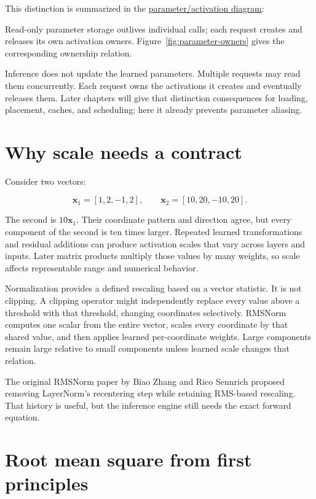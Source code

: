 This distinction is summarized in the
\href{https://github.com/hermonai/inside-the-llm-engine/blob/astra-visual-rewrite/diagrams/transformer/parameters-vs-activations.txt}{parameter/activation
diagram}:

Read-only parameter storage outlives individual calls; each request creates and releases its own activation owners. Figure~\ref{fig:parameter-owners} gives the corresponding ownership relation.

Inference does not update the learned parameters. Multiple requests may
read them concurrently. Each request owns the activations it creates and
eventually releases them. Later chapters will give that distinction
consequences for loading, placement, caches, and scheduling; here it
already prevents parameter aliasing.

\section{Why scale needs a
contract}\label{why-scale-needs-a-contract}

Consider two vectors:

\begin{equation}
\mathbf{x}_1=[1,2,-1,2],
\qquad
\mathbf{x}_2=[10,20,-10,20].
\end{equation}

The second is \(10\mathbf{x}_1\). Their coordinate pattern and direction
agree, but every component of the second is ten times larger. Repeated
learned transformations and residual additions can produce activation
scales that vary across layers and inputs. Later matrix products
multiply those values by many weights, so scale affects representable
range and numerical behavior.

Normalization provides a defined rescaling based on a vector statistic.
It is not clipping. A clipping operator might independently replace
every value above a threshold with that threshold, changing coordinates
selectively. RMSNorm computes one scalar from the entire vector, scales
every coordinate by that shared value, and then applies learned
per-coordinate weights. Large components remain large relative to small
components unless learned scale changes that relation.

The original RMSNorm paper by Biao Zhang and Rico Sennrich proposed
removing LayerNorm's recentering step while retaining RMS-based
rescaling. That history is useful, but the inference engine still needs
the exact forward equation.

\section{Root mean square from first
principles}\label{root-mean-square-from-first-principles}


